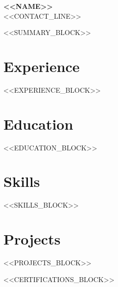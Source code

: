 \documentclass[11pt,a4paper]{article}
\begin{document}
\begin{center}
  {\Huge\bfseries <<NAME>>} \\[4pt]
  <<CONTACT_LINE>>
\end{center}

<<SUMMARY_BLOCK>>

\section{Experience}
<<EXPERIENCE_BLOCK>>

\section{Education}
<<EDUCATION_BLOCK>>

\section{Skills}
<<SKILLS_BLOCK>>

\section{Projects}
<<PROJECTS_BLOCK>>

<<CERTIFICATIONS_BLOCK>>
\end{document}
